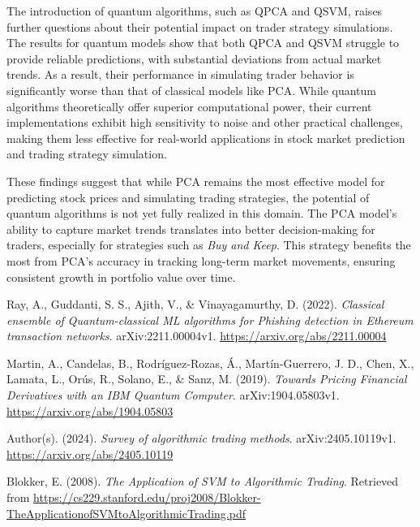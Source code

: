 \documentclass[journal]{IEEEtran}
\begin{document}
The introduction of quantum algorithms, such as QPCA and QSVM, raises further questions about their potential impact on trader strategy simulations. The results for quantum models show that both QPCA and QSVM struggle to provide reliable predictions, with substantial deviations from actual market trends. As a result, their performance in simulating trader behavior is significantly worse than that of classical models like PCA. While quantum algorithms theoretically offer superior computational power, their current implementations exhibit high sensitivity to noise and other practical challenges, making them less effective for real-world applications in stock market prediction and trading strategy simulation.

These findings suggest that while PCA remains the most effective model for predicting stock prices and simulating trading strategies, the potential of quantum algorithms is not yet fully realized in this domain. The PCA model’s ability to capture market trends translates into better decision-making for traders, especially for strategies such as \textit{Buy and Keep}. This strategy benefits the most from PCA's accuracy in tracking long-term market movements, ensuring consistent growth in portfolio value over time.

\begin{thebibliography}{99}

Ray, A., Guddanti, S. S., Ajith, V., \& Vinayagamurthy, D. (2022). \textit{Classical ensemble of Quantum-classical ML algorithms for Phishing detection in Ethereum transaction networks}. arXiv:2211.00004v1. \url{https://arxiv.org/abs/2211.00004}

Martin, A., Candelas, B., Rodríguez-Rozas, Á., Martín-Guerrero, J. D., Chen, X., Lamata, L., Orús, R., Solano, E., \& Sanz, M. (2019). \textit{Towards Pricing Financial Derivatives with an IBM Quantum Computer}. arXiv:1904.05803v1. \url{https://arxiv.org/abs/1904.05803}

Author(s). (2024). \textit{Survey of algorithmic trading methods}. arXiv:2405.10119v1. \url{https://arxiv.org/abs/2405.10119}

Blokker, E. (2008). \textit{The Application of SVM to Algorithmic Trading}. Retrieved from \url{https://cs229.stanford.edu/proj2008/Blokker-TheApplicationofSVMtoAlgorithmicTrading.pdf}

\end{thebibliography}
\end{document}

